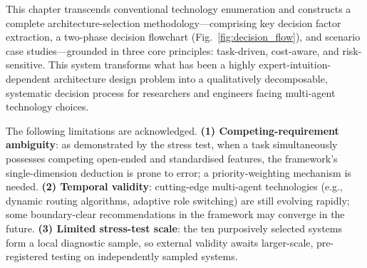 This chapter transcends conventional technology enumeration and constructs
a complete architecture-selection methodology---comprising key decision
factor extraction, a two-phase decision flowchart
(Fig.~\ref{fig:decision_flow}), and scenario case studies---grounded in
three core principles: task-driven, cost-aware, and risk-sensitive.
This system transforms what has been a highly expert-intuition-dependent
architecture design problem into a qualitatively decomposable, systematic
decision process for researchers and engineers facing multi-agent technology
choices.

The following limitations are acknowledged.
\textbf{(1) Competing-requirement ambiguity}: as demonstrated by the stress test,
when a task simultaneously possesses competing open-ended and standardised
features, the framework's single-dimension deduction is prone to error;
a priority-weighting mechanism is needed.
\textbf{(2) Temporal validity}: cutting-edge multi-agent technologies
(e.g., dynamic routing algorithms, adaptive role switching) are still
evolving rapidly; some boundary-clear recommendations in the framework
may converge in the future.
\textbf{(3) Limited stress-test scale}: the ten purposively selected systems
form a local diagnostic sample, so external validity awaits larger-scale,
pre-registered testing on independently sampled systems.
